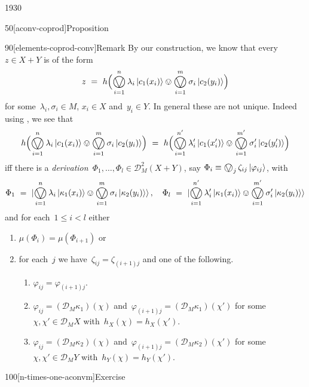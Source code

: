 \begin{parsec}{1930}
\begin{point}{50}[aconv-coprod]{Proposition}
\begin{point}{90}[elements-coprod-conv]{Remark}
By our construction, we know that
    every~$z \in X+Y$
    is of the
    form
\begin{equation*}
    z \ =\  h 
    \Bigl( \bigovee^n_{i=1} \lambda_i \ket{c_1(x_i)}
    \ovee \bigovee^m_{i=1} \sigma_i \ket{c_2(y_i)} \Bigr)
\end{equation*}
for some~$\lambda_i,\sigma_i \in M $, 
$x_i \in X$ and~$y_i \in Y$.
In general these are not unique.
Indeed
using , we see that
\begin{equation*}
     h 
     \Bigl( \bigovee^n_{i=1} \lambda_i \ket{c_1(x_i)}
     \ovee \bigovee^m_{i=1} \sigma_i \ket{c_2(y_i)} \Bigr) 
     \ = \ 
     h 
     \Bigl( \bigovee^{n'}_{i=1} \lambda'_i \ket{c_1(x'_i)}
     \ovee \bigovee^{m'}_{i=1} \sigma'_i \ket{c_2(y'_i)} \Bigr)
\end{equation*}
iff there is a \emph{derivation}~$\Phi_1, \ldots, \Phi_l \in \mathcal{D}^2_M(X+Y)$,
say $\Phi_i \equiv \bigovee_j \zeta_{ij} \ket{\varphi_{ij}}$,
with
\begin{equation*}
\Phi_1 \ =\  
\ket {\bigovee^n_{i=1} \lambda_i \ket{\kappa_1(x_i)}
\ovee \bigovee^m_{i=1} \sigma_i \ket{\kappa_2(y_i)}}
, \quad
 \Phi_l \ =\  
 \ket {\bigovee^{n'}_{i=1} \lambda'_i \ket{\kappa_1(x_i)}
 \ovee \bigovee^{m'}_{i=1} \sigma'_i \ket{\kappa_2(y_i)}}
\end{equation*}
and for each~$1 \leq i < l$ either
\begin{enumerate}
    \item $\mu(\Phi_i) = \mu(\Phi_{i+1})$
        or
    \item
        for each~$j$ we have~$\zeta_{ij} = \zeta_{(i+1)j}$
        and one of the following.
        \begin{enumerate}
        \item
    $\varphi_{ij} = \varphi_{(i+1)j}$.
\item
    $\varphi_{ij} = (\mathcal{D}_M\kappa_1) (\chi)$
and~$\varphi_{(i+1)j} = (\mathcal{D}_M\kappa_1) (\chi')$
        for some~$\chi,\chi' \in \mathcal{D}_M X$
        with~$h_X( \chi) = h_X(\chi')$.
\item
    $\varphi_{ij} = (\mathcal{D}_M\kappa_2) (\chi)$
and~$\varphi_{(i+1)j} = (\mathcal{D}_M\kappa_2) (\chi')$
        for some~$\chi,\chi' \in \mathcal{D}_M Y$
        with~$h_Y( \chi) = h_Y(\chi')$.
        \end{enumerate}
\end{enumerate}
\end{point}
\end{point}
\spacingfix{}
\begin{point}{100}[n-times-one-aconvm]{Exercise}%

\end{point}
\end{parsec}
